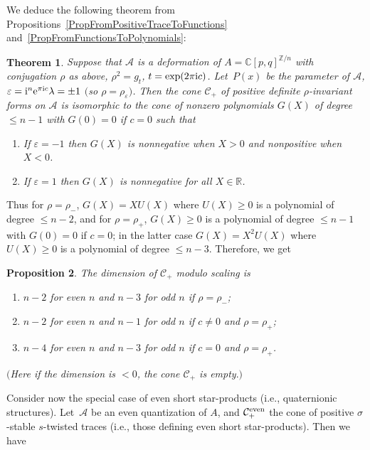 \documentclass[10pt,a4paper]{amsart}
\newcommand{\RN}{\mathbb{R}} %
\newcommand{\CN}{\mathbb{C}} %
\newcommand{\mc}[1]{\mathcal{#1}}
\newtheorem{Theorem}{Theorem}[section]
\newtheorem{Proposition}[Theorem]{Proposition}
\theoremstyle{definition}
\numberwithin{equation}{section}
\begin{document}
We deduce the following theorem from Propositions~\ref{PropFromPositiveTraceToFunctions} and~\ref{PropFromFunctionsToPolynomials}:
\begin{Theorem}
\label{ThrPositiveFormSmallerThanOne}
Suppose that $\mc{A}$ is a deformation of $A=\CN[p,q]^{\mathbb Z/n}$ with conjugation $\rho$ as above, $\rho^2=g_t$, $t=\exp(2\pi {\rm i} c)$. Let~$P(x)$ be the parameter of $\mc{A}$, $\varepsilon={\rm i}^n{\rm e}^{\pi {\rm i}c}\lambda=\pm 1$ $($so $\rho=\rho_\varepsilon)$. Then the cone $\mc C_+$ of positive definite $\rho$-invariant forms on $\mc{A}$ is isomorphic to the cone of nonzero polynomials $G(X)$ of degree $\le n-1$ with $G(0)=0$ if $c=0$ such that
\begin{enumerate}\itemsep=0pt
\item[$1.$] If $\varepsilon=-1$ then $G(X)$ is nonnegative when $X>0$ and nonpositive when $X<0$.
\item[$2.$] If $\varepsilon=1$ then $G(X)$ is nonnegative for all $X\in \RN$.
\end{enumerate}
\end{Theorem}

Thus for $\rho=\rho_-$, $G(X)=XU(X)$ where $U(X)\ge 0$ is a polynomial of degree $\le n-2$, and for $\rho=\rho_+$, $G(X)\ge 0$ is a polynomial of degree $\le n-1$ with $G(0)=0$ if $c=0$; in the latter case $G(X)=X^2U(X)$ where $U(X)\ge 0$ is a polynomial of degree $\le n-3$. Therefore, we get

\begin{Proposition} The dimension of $\mc C_+$ modulo scaling is
\begin{enumerate}\itemsep=0pt
\item[$\bullet$] $n-2$ for even $n$ and $n-3$ for odd $n$ if $\rho=\rho_-$;

\item[$\bullet$] $n-2$ for even $n$ and $n-1$ for odd $n$ if $c\ne 0$ and $\rho=\rho_+$;

\item[$\bullet$] $n-4$ for even $n$ and $n-3$ for odd $n$ if $c=0$ and $\rho=\rho_+$.
\end{enumerate}
$($Here if the dimension is $<0$, the cone $\mc C_+$ is empty$.)$
\end{Proposition}

Consider now the special case of even short star-products (i.e., quaternionic structures). Let~$\mc A$ be an even quantization of $A$, and
$\mc C_+^{\rm even}$ the cone of positive $\sigma$-stable $s$-twisted traces (i.e., those defining even short star-products). Then we have
\end{document}
